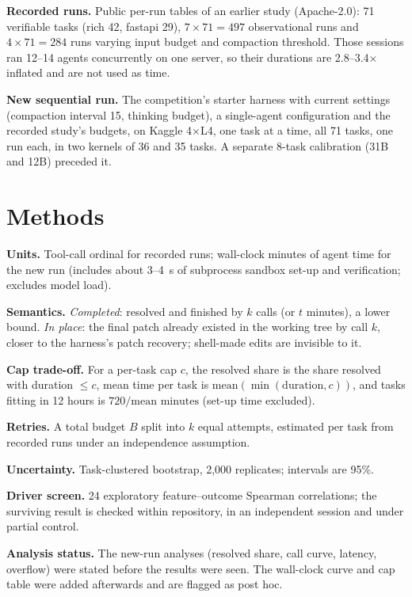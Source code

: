 \documentclass[10pt,twocolumn]{article}
\begin{document}
\textbf{Recorded runs.} Public per-run tables of an earlier study (Apache-2.0): 71 verifiable tasks (rich 42, fastapi 29), $7\times71=497$ observational runs and $4\times71=284$ runs varying input budget and compaction threshold. Those sessions ran 12--14 agents concurrently on one server, so their durations are 2.8--3.4$\times$ inflated and are not used as time.

\textbf{New sequential run.} The competition's starter harness with current settings (compaction interval 15, thinking budget), a single-agent configuration and the recorded study's budgets, on Kaggle 4$\times$L4, one task at a time, all 71 tasks, one run each, in two kernels of 36 and 35 tasks. A separate 8-task calibration (31B and 12B) preceded it.

\section{Methods}
\textbf{Units.} Tool-call ordinal for recorded runs; wall-clock minutes of agent time for the new run (includes about 3--4~s of subprocess sandbox set-up and verification; excludes model load).

\textbf{Semantics.} \emph{Completed}: resolved and finished by $k$ calls (or $t$ minutes), a lower bound. \emph{In place}: the final patch already existed in the working tree by call $k$, closer to the harness's patch recovery; shell-made edits are invisible to it.

\textbf{Cap trade-off.} For a per-task cap $c$, the resolved share is the share resolved with duration $\le c$, mean time per task is $\mathrm{mean}(\min(\text{duration},c))$, and tasks fitting in 12 hours is $720/\text{mean minutes}$ (set-up time excluded).

\textbf{Retries.} A total budget $B$ split into $k$ equal attempts, estimated per task from recorded runs under an independence assumption.

\textbf{Uncertainty.} Task-clustered bootstrap, 2,000 replicates; intervals are 95\%.

\textbf{Driver screen.} 24 exploratory feature--outcome Spearman correlations; the surviving result is checked within repository, in an independent session and under partial control.

\textbf{Analysis status.} The new-run analyses (resolved share, call curve, latency, overflow) were stated before the results were seen. The wall-clock curve and cap table were added afterwards and are flagged as post hoc.
\end{document}
